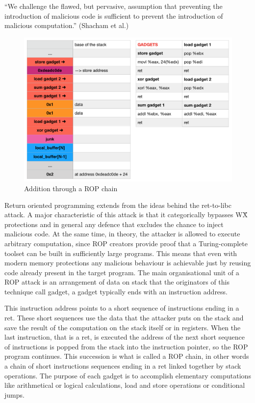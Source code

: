 \documentclass[Lau,binding=0.6cm]{sapthesis}
\begin{document}
“We challenge the flawed, but pervasive, assumption that preventing the introduction of malicious code is sufficient to prevent the introduction of malicious computation.” (Shacham et al.)

\begin{figure}
\centering
\includegraphics[width=1\textwidth]{ropadd}
\caption{Addition through a ROP chain}
\label{fig:largenenough}
\end{figure}

Return oriented programming extends from the ideas behind the ret-to-libc attack. A major characteristic of this attack is that it categorically bypasses W\^X protections and in general any defence that excludes the chance to inject malicious code. At the same time, in theory, the attacker is allowed to execute arbitrary computation, since ROP creators provide proof that a Turing-complete toolset can be built in sufficiently large programs. 
This means that even with modern memory protections any malicious behaviour is achievable just by reusing code already present in the target program.
The main organisational unit of a ROP attack is an arrangement of data on stack that the originators of this technique call gadget, a gadget typically ends with an instruction address.


This instruction address points to a short sequence of instructions ending in a ret. These short sequences use the data that the attacker puts on the stack and save the result of the computation on the stack itself or in registers. When the last instruction, that is a ret, is executed the address of the next short sequence of instructions is popped from the stack into the instruction pointer, so the ROP program continues. 
This succession is what is called a ROP chain, in other words a chain of short instructions sequences ending in a ret linked together by stack operations.
The purpose of each gadget is to accomplish elementary computations like arithmetical or logical calculations, load and store operations or conditional jumps.
\end{document}
